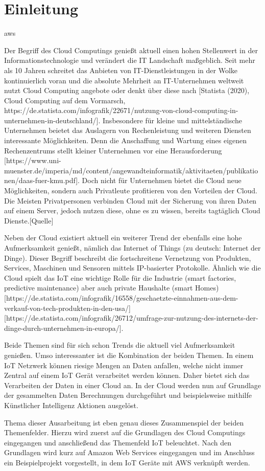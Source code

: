 \chapter{Einleitung}\label{ch:1}
\acrfull{aws}

Der Begriff des Cloud Computings genießt aktuell einen hohen Stellenwert in der Informationstechnologie und verändert die IT Landschaft maßgeblich. Seit mehr als 10 Jahren schreitet das Anbieten von IT-Dienstleistungen in der Wolke kontinuierlich voran und die absolute Mehrheit an IT-Unternehmen weltweit nutzt Cloud Computing angebote oder denkt über diese nach [Statista (2020), Cloud Computing auf dem Vormarsch, https://de.statista.com/infografik/22671/nutzung-von-cloud-computing-in-unternehmen-in-deutschland/]. Insbesondere für kleine und mittelständische Unternehmen beietet das Auslagern von Rechenleistung und weiteren Diensten interessante Möglichkeiten. Denn die Anschaffung und Wartung eines eigenen Rechenzentrums stellt kleiner Unternehmen vor eine Herausforderung [https://www.uni-muenster.de/imperia/md/content/angewandteinformatik/aktivitaeten/publikationen/daas-fuer-kmu.pdf]. Doch nicht für Unternehmen bietet die Cloud neue Möglichkeiten, sondern auch Privatleute profitieren von den Vorteilen der Cloud. Die Meisten Privatpersonen verbinden Cloud mit der Sicherung von ihren Daten auf einem Server, jedoch nutzen diese, ohne es zu wissen, bereits tagtäglich Cloud Dienste.[Quelle] 

Neben der Cloud existiert aktuell ein weiterer Trend der ebenfalls eine hohe Aufmerksamkeit genießt, nämlich das Internet of Things (zu deutsch: Internet der Dinge). Dieser Begriff beschreibt die fortschreitene Vernetzung von Produkten, Services, Maschinen und Sensoren mittels IP-basierter Protokolle. Ähnlich wie die Cloud spielt das IoT eine wichtige Rolle für die Industrie (smart factories, predictive maintenance) aber auch private Haushalte (smart Homes) [https://de.statista.com/infografik/16558/geschaetzte-einnahmen-aus-dem-verkauf-von-tech-produkten-in-den-usa/][https://de.statista.com/infografik/26712/umfrage-zur-nutzung-des-internets-der-dinge-durch-unternehmen-in-europa/]. 

Beide Themen sind für sich schon Trends die aktuell viel Aufmerksamkeit genießen. Umso interessanter ist die Kombination der beiden Themen. In einem IoT Netzwerk können riesige Mengen an Daten anfallen, welche nicht immer Zentral auf einem IoT Gerät verarbeitet werden können. Daher bietet sich das Verarbeiten der Daten in einer Cloud an. In der Cloud werden nun auf Grundlage der gesammelten Daten Berechnungen durchgeführt und beispielsweise mithilfe Künstlicher Intelligenz Aktionen ausgelöst. 

Thema dieser Ausarbeitung ist eben genau dieses Zusammenspiel der beiden Themenfelder. Hierzu wird zuerst auf die Grundlagen des Cloud Computings eingegangen und anschließend das Themenfeld IoT beleuchtet. Nach den Grundlagen wird kurz auf Amazon Web Services eingegangen und im Anschluss ein Beispielprojekt vorgestellt, in dem IoT Geräte mit AWS verknüpft werden.  
     